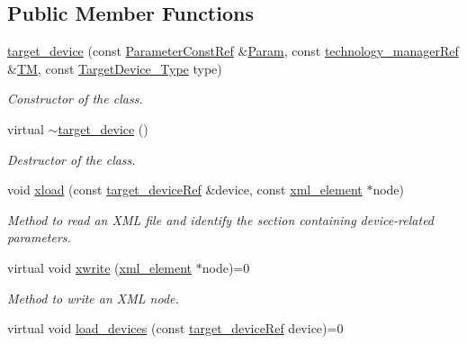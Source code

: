 \subsection*{Public Member Functions}
\begin{DoxyCompactItemize}
\item 
\hyperlink{classtarget__device_af1125b9f691005573db32414f1c8c34f}{target\+\_\+device} (const \hyperlink{Parameter_8hpp_a37841774a6fcb479b597fdf8955eb4ea}{Parameter\+Const\+Ref} \&\hyperlink{classtarget__device_a2ab6118c487cc65cf7fe3462c96967ec}{Param}, const \hyperlink{technology__manager_8hpp_a4b9ecd440c804109c962654f9227244e}{technology\+\_\+manager\+Ref} \&\hyperlink{classtarget__device_a941853b670a1b34eae7eab6bd21c854a}{TM}, const \hyperlink{target__device_8hpp_a476becc690220f0805ce73006449c732}{Target\+Device\+\_\+\+Type} type)
\begin{DoxyCompactList}\small\item\em Constructor of the class. \end{DoxyCompactList}\item 
virtual \hyperlink{classtarget__device_ac217a819b8157d92cf1a8dc69843944c}{$\sim$target\+\_\+device} ()
\begin{DoxyCompactList}\small\item\em Destructor of the class. \end{DoxyCompactList}\item 
void \hyperlink{classtarget__device_a1a2a15130520d7298b0633cbd81757ac}{xload} (const \hyperlink{target__device_8hpp_acedb2b7a617e27e6354a8049fee44eda}{target\+\_\+device\+Ref} \&device, const \hyperlink{classxml__element}{xml\+\_\+element} $\ast$node)
\begin{DoxyCompactList}\small\item\em Method to read an X\+ML file and identify the section containing device-\/related parameters. \end{DoxyCompactList}\item 
virtual void \hyperlink{classtarget__device_adddcd8f3eed98d93007b4ebc68be2f82}{xwrite} (\hyperlink{classxml__element}{xml\+\_\+element} $\ast$node)=0
\begin{DoxyCompactList}\small\item\em Method to write an X\+ML node. \end{DoxyCompactList}\item 
virtual void \hyperlink{classtarget__device_a1823ff5860c8045600b512588415ac6e}{load\+\_\+devices} (const \hyperlink{target__device_8hpp_acedb2b7a617e27e6354a8049fee44eda}{target\+\_\+device\+Ref} device)=0

\end{DoxyCompactItemize}
